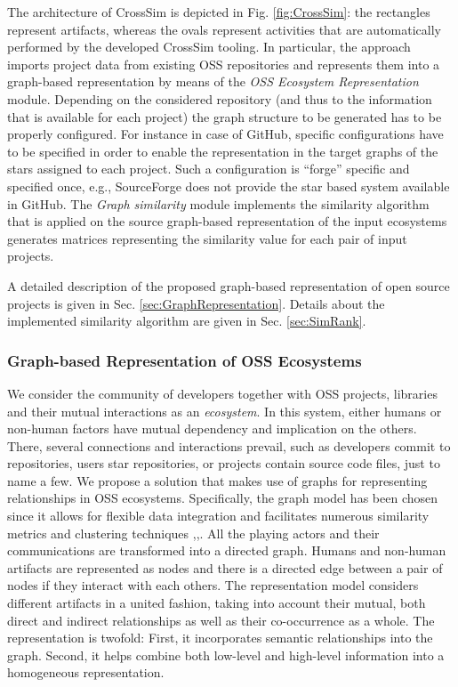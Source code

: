 The architecture of CrossSim is depicted in Fig. \ref{fig:CrossSim}: the rectangles represent artifacts, whereas the ovals represent activities that are automatically performed by the developed CrossSim tooling. In particular, the approach imports project data from existing OSS repositories and represents them into a graph-based representation by means of the \emph{OSS Ecosystem Representation} module. Depending on the considered repository (and thus to the information that is available for each project) the graph structure to be generated has to be properly configured. For instance in case of GitHub, specific configurations have to be specified in order to enable the representation in the target graphs of the stars assigned to each project. Such a configuration is ``forge'' specific and specified once, e.g., SourceForge does not provide the star based system available in GitHub. 
%
The \emph{Graph similarity} module implements the similarity algorithm that is applied on the source graph-based representation of the input ecosystems generates matrices representing the similarity value for each pair of input projects. 

A detailed description of the proposed graph-based representation of open source projects is given in Sec. \ref{sec:GraphRepresentation}. Details about the implemented similarity algorithm are given in Sec. \ref{sec:SimRank}.

\subsubsection{Graph-based Representation of OSS Ecosystems}
We consider the community of developers together with OSS projects, libraries and their mutual interactions as an \emph{ecosystem}. In this system, either humans or non-human factors have mutual dependency and implication on the others. There, several connections and interactions prevail, such as developers commit to repositories, users star repositories, or projects contain source code files, just to name a few. We propose a solution that makes use of graphs for representing relationships in OSS ecosystems. Specifically, the graph model has been chosen since it allows for flexible data integration and facilitates numerous similarity metrics and clustering techniques \cite{Blondel:2004:MSG:1035533.1035557},\cite{Lu2007},\cite{Schaeffer:2007:SGC:2296006.2296057}. All the playing actors and their communications are transformed into a directed graph. Humans and non-human artifacts are represented as nodes and there is a directed edge between a pair of nodes if they interact with each others. The representation model considers different artifacts in a united fashion, taking into account their mutual, both direct and indirect relationships as well as their co-occurrence as a whole. The representation is twofold: First, it incorporates semantic relationships into the graph. Second, it helps combine both low-level and high-level information into a homogeneous representation.




